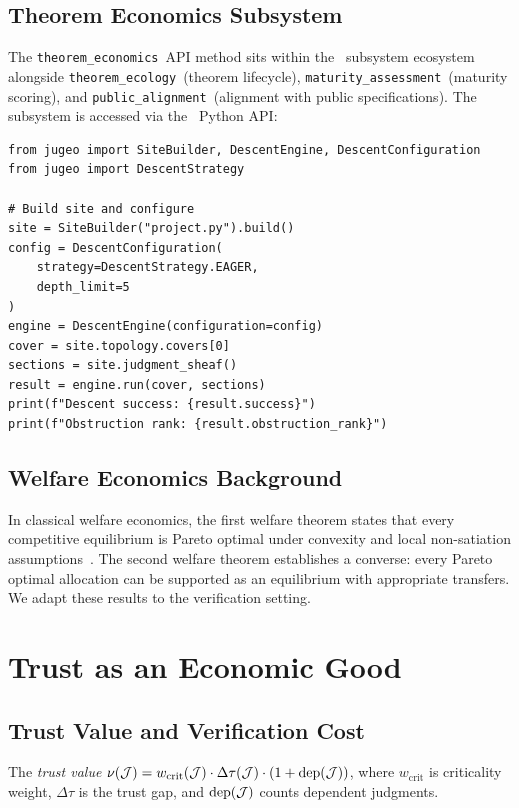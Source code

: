 \documentclass[11pt]{article}
\newcommand{\TrustValue}{\nu}
\newcommand{\ThmEcon}{\texttt{theorem\_economics}}
\newcommand{\ThmEcol}{\texttt{theorem\_ecology}}
\newcommand{\MatAssess}{\texttt{maturity\_assessment}}
\newcommand{\PublicAlign}{\texttt{public\_alignment}}
\begin{document}
\subsection{Theorem Economics Subsystem}
The \ThmEcon\ API method sits within the \JuGeo\ subsystem ecosystem
alongside \ThmEcol\ (theorem lifecycle), \MatAssess\ (maturity
scoring), and \PublicAlign\ (alignment with public specifications).
The subsystem is accessed via the \JuGeo\ Python API:

\begin{lstlisting}[style=jugeo-python]
from jugeo import SiteBuilder, DescentEngine, DescentConfiguration
from jugeo import DescentStrategy

# Build site and configure
site = SiteBuilder("project.py").build()
config = DescentConfiguration(
    strategy=DescentStrategy.EAGER,
    depth_limit=5
)
engine = DescentEngine(configuration=config)
cover = site.topology.covers[0]
sections = site.judgment_sheaf()
result = engine.run(cover, sections)
print(f"Descent success: {result.success}")
print(f"Obstruction rank: {result.obstruction_rank}")
\end{lstlisting}

\subsection{Welfare Economics Background}
In classical welfare economics, the first welfare theorem states that
every competitive equilibrium is Pareto optimal under convexity and
local non-satiation assumptions~\cite{Nisan2007}.  The second welfare
theorem establishes a converse: every Pareto optimal allocation can be
supported as an equilibrium with appropriate transfers.  We adapt these
results to the verification setting.

\section{Trust as an Economic Good}\label{sec:trust-model}

\subsection{Trust Value and Verification Cost}
\begin{definition}\label{def:trust-value}
The \emph{trust value} $\TrustValue(\J) = w_{\text{crit}}(\J) \cdot
\Delta\tau(\J) \cdot (1 + \text{dep}(\J))$, where $w_{\text{crit}}$
is criticality weight, $\Delta\tau$ is the trust gap, and
$\text{dep}(\mathcal{J})$ counts dependent judgments.
\end{definition}
\end{document}
